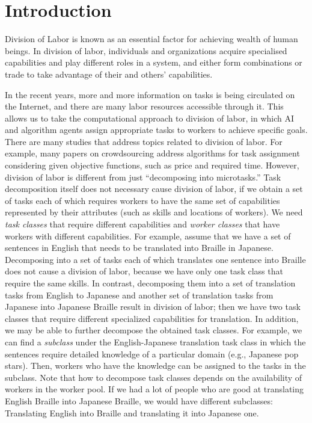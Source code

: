 \section{Introduction}
\label{sec:introduction}

Division of Labor is known as  an essential factor for achieving wealth of human beings. In division of labor, individuals and organizations acquire specialised capabilities and play different roles in a system, and either form combinations or trade to take advantage of  their and others' capabilities. 

In the recent years, more and more information on tasks is being circulated on the Internet, and there are many labor resources accessible through it. This allows us to take the computational approach to division of labor, in which AI and algorithm agents assign appropriate tasks to workers to achieve specific goals.
There are many studies that address topics related to division of labor. 
For example, many papers on crowdsourcing address algorithms  for task assignment considering given objective functions, such as price and required time.
However, division of labor is different from  just ``decomposing into microtasks.'' Task decomposition itself does not necessary cause division of labor, if we obtain a set of tasks each of which requires workers to have the same set of capabilities represented by  their attributes (such as skills and locations of workers).
We need {\it task classes} that require different capabilities and {\it worker classes} that have workers with different capabilities.
For example, assume that we have a set of sentences in English that needs to be translated into Braille in Japanese. 
Decomposing into a set of tasks each of which translates one sentence into Braille does not cause a division of labor, because we have only one task class that require the same skills.
In contrast, decomposing them into a set of translation tasks from English to Japanese and another set of translation tasks from Japanese into Japanese Braille result in division of labor; then we have two task classes that require different specialized capabilities for translation.
In addition, we may be able to further decompose the obtained task classes. For example, we can find a {\it subclass} under the English-Japanese translation task class in which the sentences require detailed knowledge of a particular domain (e.g., Japanese pop stars). 
Then, workers who have the knowledge can be assigned to the tasks in the subclass.
Note that how to decompose task classes depends on the availability of workers in the worker pool. If we had a lot of people who are good at translating English Braille into Japanese Braille, we would have different subclasses: Translating English into Braille and translating it into Japanese one.
 

